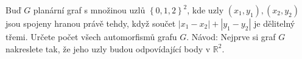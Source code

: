 Buď $G$ planární graf s množinou uzlů $\left \{ 0,1,2 \right \}^{2}$, kde uzly
$\left ( x_{1},y_{1} \right ),\left ( x_{2},y_{2} \right )$ jsou spojeny hranou
právě tehdy, když součet $\left | x_{1}-x_{2} \right |+\left | y_{1}-y_{2}
\right |$ je dělitelný třemi. Určete počet všech automorfismů grafu $G$. Návod:
Nejprve si graf $G$ nakreslete tak, že jeho uzly budou odpovídající body v
$\mathbb{R}^{2}$.
